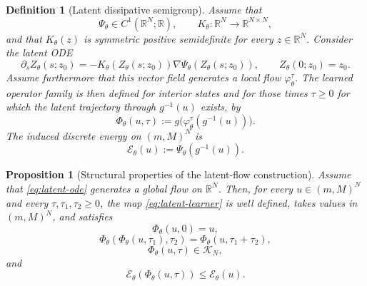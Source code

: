 \documentclass[11pt]{article}
\newtheorem{definition}{Definition}
\newtheorem{proposition}{Proposition}
\newcommand{\R}{\mathbb{R}}
\newcommand{\cK}{\mathcal{K}}
\newcommand{\cE}{\mathcal{E}}
\newcommand{\PhiT}{\Phi_{\theta}}
\begin{document}
\begin{definition}[Latent dissipative semigroup]\label{def:latent-semigroup}
Assume that
\begin{equation}\label{eq:latent-objects}
\Psi_{\theta}\in C^1(\R^N;\R), \qquad K_{\theta}:\R^N\to \R^{N\times N},
\end{equation}
and that \(K_{\theta}(z)\) is symmetric positive semidefinite for every \(z\in \R^N\). Consider the latent ODE
\begin{equation}\label{eq:latent-ode}
\partial_s Z_{\theta}(s;z_0)=-K_{\theta}(Z_{\theta}(s;z_0))\nabla \Psi_{\theta}(Z_{\theta}(s;z_0)), \qquad Z_{\theta}(0;z_0)=z_0.
\end{equation}
Assume furthermore that this vector field generates a local flow \(\varphi_{\theta}^{\tau}\). The learned operator family is then defined for interior states and for those times \(\tau\ge 0\) for which the latent trajectory through \(g^{-1}(u)\) exists, by
\begin{equation}\label{eq:latent-learner}
\PhiT(u,\tau):=g\bigl(\varphi_{\theta}^{\tau}(g^{-1}(u))\bigr).
\end{equation}
The induced discrete energy on \((m,M)^N\) is
\begin{equation}\label{eq:induced-energy}
\cE_{\theta}(u):=\Psi_{\theta}(g^{-1}(u)).
\end{equation}
\end{definition}

\begin{proposition}[Structural properties of the latent-flow construction]\label{prop:structure}
Assume that \eqref{eq:latent-ode} generates a global flow on \(\R^N\). Then, for every \(u\in (m,M)^N\) and every \(\tau,\tau_1,\tau_2\ge 0\), the map \eqref{eq:latent-learner} is well defined, takes values in \((m,M)^N\), and satisfies
\begin{equation}\label{eq:structure-p1}
\PhiT(u,0)=u,
\end{equation}
\begin{equation}\label{eq:structure-p3}
\PhiT(\PhiT(u,\tau_1),\tau_2)=\PhiT(u,\tau_1+\tau_2),
\end{equation}
\begin{equation}\label{eq:structure-p4}
\PhiT(u,\tau)\in \cK_N,
\end{equation}
and
\begin{equation}\label{eq:structure-p5}
\cE_{\theta}(\PhiT(u,\tau))\le \cE_{\theta}(u).
\end{equation}
\end{proposition}
\end{document}
